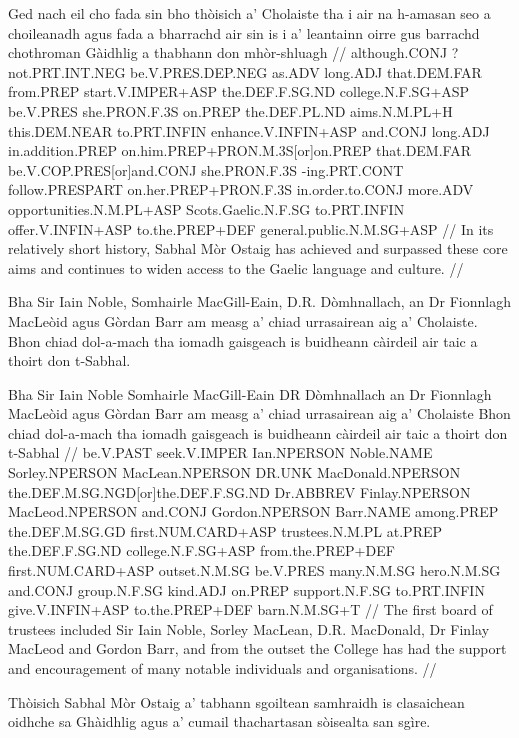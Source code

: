 \documentclass[a4paper,10pt]{article}
\begin{document}
\vspace{4mm}
\gla Ged nach eil cho fada sin bho thòisich a' Cholaiste tha i air na h-amasan seo a choileanadh agus fada {a bharrachd} air sin is i a' leantainn oirre gus barrachd chothroman Gàidhlig a thabhann don mhòr-shluagh  //
\glb although.CONJ ?not.PRT.INT.NEG be.V.PRES.DEP.NEG as.ADV long.ADJ that.DEM.FAR from.PREP start.V.IMPER+ASP the.DEF.F.SG.ND college.N.F.SG+ASP be.V.PRES she.PRON.F.3S on.PREP the.DEF.PL.ND aims.N.M.PL+H this.DEM.NEAR to.PRT.INFIN enhance.V.INFIN+ASP and.CONJ long.ADJ in.addition.PREP on.him.PREP+PRON.M.3S[or]on.PREP that.DEM.FAR be.V.COP.PRES[or]and.CONJ she.PRON.F.3S -ing.PRT.CONT follow.PRESPART on.her.PREP+PRON.F.3S in.order.to.CONJ more.ADV opportunities.N.M.PL+ASP Scots.Gaelic.N.F.SG to.PRT.INFIN offer.V.INFIN+ASP to.the.PREP+DEF general.public.N.M.SG+ASP  //
\glft In its relatively short history, Sabhal Mòr Ostaig has achieved and surpassed these core aims and continues to widen access to the Gaelic language and culture. //
\endgl
\xe

\ex
\begingl
\glpre Bha Sir Iain Noble, Somhairle MacGill-Eain, D.R. Dòmhnallach, an Dr Fionnlagh MacLeòid agus Gòrdan Barr am measg a' chiad urrasairean aig a' Cholaiste. Bhon chiad dol-a-mach tha iomadh gaisgeach is buidheann càirdeil air taic a thoirt don t-Sabhal. 

\vspace{4mm}
\gla Bha Sir Iain Noble Somhairle MacGill-Eain DR Dòmhnallach an Dr Fionnlagh MacLeòid agus Gòrdan Barr {am measg} a' chiad urrasairean aig a' Cholaiste Bhon chiad dol-a-mach tha iomadh gaisgeach is buidheann càirdeil air taic a thoirt don t-Sabhal  //
\glb be.V.PAST seek.V.IMPER Ian.NPERSON Noble.NAME Sorley.NPERSON MacLean.NPERSON DR.UNK MacDonald.NPERSON the.DEF.M.SG.NGD[or]the.DEF.F.SG.ND Dr.ABBREV Finlay.NPERSON MacLeod.NPERSON and.CONJ Gordon.NPERSON Barr.NAME among.PREP the.DEF.M.SG.GD first.NUM.CARD+ASP trustees.N.M.PL at.PREP the.DEF.F.SG.ND college.N.F.SG+ASP from.the.PREP+DEF first.NUM.CARD+ASP outset.N.M.SG be.V.PRES many.N.M.SG hero.N.M.SG and.CONJ group.N.F.SG kind.ADJ on.PREP support.N.F.SG to.PRT.INFIN give.V.INFIN+ASP to.the.PREP+DEF barn.N.M.SG+T  //
\glft The first board of trustees included Sir Iain Noble, Sorley MacLean, D.R. MacDonald, Dr Finlay MacLeod and Gordon Barr, and from the outset the College has had the support and encouragement of many notable individuals and organisations. //
\endgl
\xe

\ex
\begingl
\glpre Thòisich Sabhal Mòr Ostaig a' tabhann sgoiltean samhraidh is clasaichean oidhche sa Ghàidhlig agus a' cumail thachartasan sòisealta san sgìre. 
\end{document}
